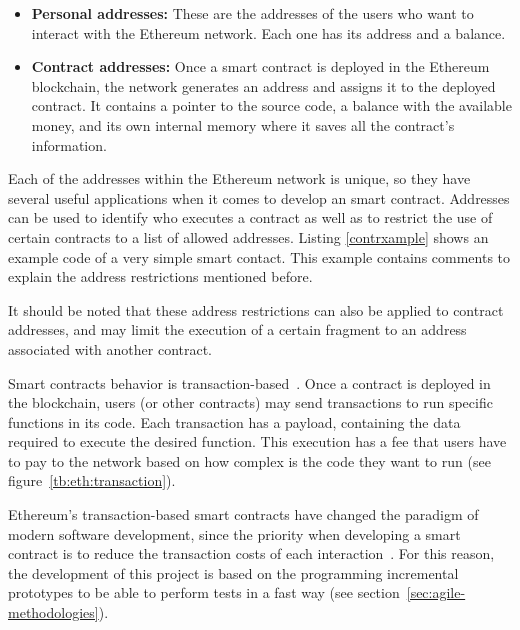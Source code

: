 \begin{itemize}

\item \textbf{Personal addresses:} These are the addresses of the users who want
  to interact with the Ethereum network. Each one has its address and a balance.
  
\item \textbf{Contract addresses:} Once a smart contract is deployed in the
  Ethereum blockchain, the network generates an address and assigns it to the
  deployed contract. It contains a pointer to the source code, a balance with
  the available money, and its own internal memory where it saves all the
  contract's information.

\end{itemize}

Each of the addresses within the Ethereum network is unique, so they have
several useful applications when it comes to develop an smart contract.
Addresses can be used to identify who executes a contract as well as to restrict
the use of certain contracts to a list of allowed addresses. Listing
\ref{contrxample} shows an example code of a very simple smart contact. This
example contains comments to explain the address restrictions mentioned before.

It should be noted that these address restrictions can also be applied to
contract addresses, and may limit the execution of a certain fragment to an
address associated with another contract.



Smart contracts behavior is transaction-based~\cite{wood2014ethereum}. Once a
contract is deployed in the blockchain, users (or other contracts) may send
transactions to run specific functions in its code. Each transaction has a
payload, containing the data required to execute the desired function. This
execution has a fee that users have to pay to the network based on how complex
is the code they want to run (see figure~\ref{tb:eth:transaction}).

Ethereum's transaction-based smart contracts have changed the paradigm of modern
software development, since the priority when developing a smart contract is to
reduce the transaction costs of each interaction~\cite{delmolino2016step}. For
this reason, the development of this project is based on the programming
incremental prototypes to be able to perform tests in a fast way (see
section~\ref{sec:agile-methodologies}).


